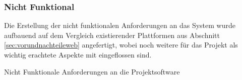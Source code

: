 \subsubsection{Nicht Funktional}\label{sec:nichtfunc}
Die Erstellung der nicht funktionalen Anforderungen an das System wurde aufbauend auf 
dem Vergleich existierender Plattformen aus Abschnitt \ref{sec:vorundnachteileweb} angefertigt,
wobei noch weitere für das Projekt als wichtig erachtete Aspekte mit eingeflossen sind. 
\begin{table}[h!]
	\caption{Nicht Funktionale Anforderungen an die Projektsoftware}
	\label{tab:nichtfunkanf}


\end{table}
